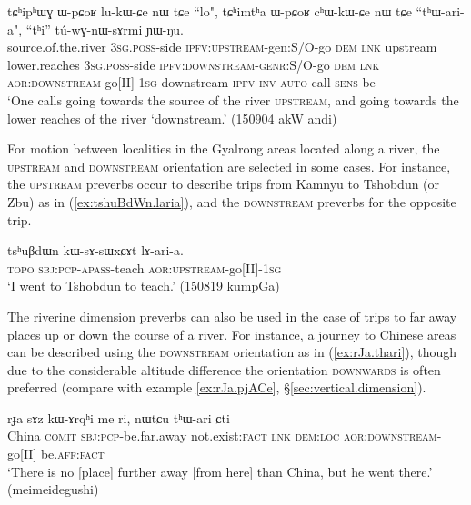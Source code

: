 \begin{exe}
\ex \label{ex:tChiphWG}
\gll   tɕʰipʰɯɣ ɯ-pɕoʁ lu-kɯ-ɕe nɯ tɕe ``lo", tɕʰimtʰa ɯ-pɕoʁ cʰɯ-kɯ-ɕe nɯ tɕe ``tʰɯ-ari-a",  ``tʰi'' tú-wɣ-nɯ-sɤrmi ɲɯ-ŋu.  \\
source.of.the.river \textsc{3sg}.\textsc{poss}-side \textsc{ipfv}:\textsc{upstream}-gen:S/O-go \textsc{dem} \textsc{lnk} upstream lower.reaches \textsc{3sg}.\textsc{poss}-side \textsc{ipfv}:\textsc{downstream}-\textsc{genr}:S/O-go \textsc{dem} \textsc{lnk} \textsc{aor}:\textsc{downstream}-go[II]-\textsc{1sg} downstream \textsc{ipfv}-\textsc{inv}-\textsc{auto}-call \textsc{sens}-be \\
\glt `One calls going towards the source of the river \textsc{upstream}, and going towards the lower reaches of the river `downstream.' (150904 akW andi)
\end{exe}

For motion between localities in the Gyalrong areas located along a river, the \textsc{upstream} and \textsc{downstream} orientation are selected in some cases. For instance, the \textsc{upstream} preverbs occur to describe trips from Kamnyu to Tshobdun (or Zbu) as in (\ref{ex:tshuBdWn.laria}), and the \textsc{downstream} preverbs for the opposite trip.

 \begin{exe}
\ex \label{ex:tshuBdWn.laria}
\gll  tsʰuβdɯn kɯ-sɤ-sɯxɕɤt lɤ-ari-a. \\
\textsc{topo} \textsc{sbj}:\textsc{pcp}-\textsc{apass}-teach \textsc{aor}:\textsc{upstream}-go[II]-\textsc{1sg} \\
\glt `I went to Tshobdun to teach.' (150819 kumpGa) 
\end{exe}

The  riverine dimension preverbs can also be used in the case of trips to far away places up or down the course of a river. For instance, a journey to Chinese areas can be described using the \textsc{downstream} orientation as in (\ref{ex:rJa.thari}), though due to the considerable altitude difference the orientation \textsc{downwards} is often preferred (compare with example \ref{ex:rJa.pjACe}, §\ref{sec:vertical.dimension}).

 \begin{exe}
\ex \label{ex:rJa.thari}
\gll rɟa sɤz kɯ-ɤrqʰi me ri, nɯtɕu tʰɯ-ari ɕti  \\
China \textsc{comit} \textsc{sbj}:\textsc{pcp}-be.far.away not.exist:\textsc{fact} \textsc{lnk} \textsc{dem}:\textsc{loc} \textsc{aor}:\textsc{downstream}-go[II] be.\textsc{aff}:\textsc{fact} \\
\glt `There is no [place] further away [from here] than China, but he went there.' (meimeidegushi)
\end{exe}
 
